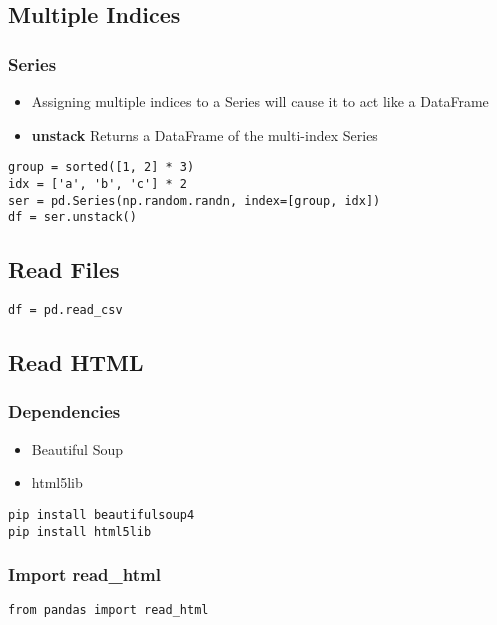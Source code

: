 %
\subsection{Multiple Indices}

%
\subsubsection{Series}
\begin{itemize}
  \item Assigning multiple indices to a Series will cause it to act like a
    DataFrame

  \item \textbf{unstack} Returns a DataFrame of the multi-index Series
\end{itemize}
\begin{lstlisting}
group = sorted([1, 2] * 3)
idx = ['a', 'b', 'c'] * 2
ser = pd.Series(np.random.randn, index=[group, idx])
df = ser.unstack()
\end{lstlisting}

\subsection{Read Files}
\begin{lstlisting}
df = pd.read_csv
\end{lstlisting}

\subsection{Read HTML}

%
\subsubsection{Dependencies}
\begin{itemize}

  \item Beautiful Soup

  \item html5lib
\end{itemize}
\begin{lstlisting}
pip install beautifulsoup4
pip install html5lib
\end{lstlisting}

%
\subsubsection{Import read\_html}
\begin{lstlisting}
from pandas import read_html
\end{lstlisting}

